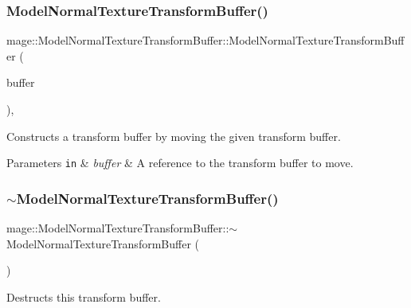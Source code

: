 \subsubsection{\texorpdfstring{Model\+Normal\+Texture\+Transform\+Buffer()}{ModelNormalTextureTransformBuffer()}\hspace{0.1cm}{\footnotesize\ttfamily [3/3]}}
{\footnotesize\ttfamily mage\+::\+Model\+Normal\+Texture\+Transform\+Buffer\+::\+Model\+Normal\+Texture\+Transform\+Buffer (\begin{DoxyParamCaption}\item[{\hyperlink{structmage_1_1_model_normal_texture_transform_buffer}{Model\+Normal\+Texture\+Transform\+Buffer} \&\&}]{buffer }\end{DoxyParamCaption})\hspace{0.3cm}{\ttfamily [default]}, {\ttfamily [noexcept]}}

Constructs a transform buffer by moving the given transform buffer.


\begin{DoxyParams}[1]{Parameters}
\mbox{\tt in}  & {\em buffer} & A reference to the transform buffer to move. \\
\hline
\end{DoxyParams}
\hypertarget{structmage_1_1_model_normal_texture_transform_buffer_a5b37f45ead4f5b40e2d9de8ef116a057}{}\label{structmage_1_1_model_normal_texture_transform_buffer_a5b37f45ead4f5b40e2d9de8ef116a057} 
\subsubsection{\texorpdfstring{$\sim$\+Model\+Normal\+Texture\+Transform\+Buffer()}{~ModelNormalTextureTransformBuffer()}}
{\footnotesize\ttfamily mage\+::\+Model\+Normal\+Texture\+Transform\+Buffer\+::$\sim$\+Model\+Normal\+Texture\+Transform\+Buffer (\begin{DoxyParamCaption}{ }\end{DoxyParamCaption})\hspace{0.3cm}{\ttfamily [default]}}

Destructs this transform buffer. 

